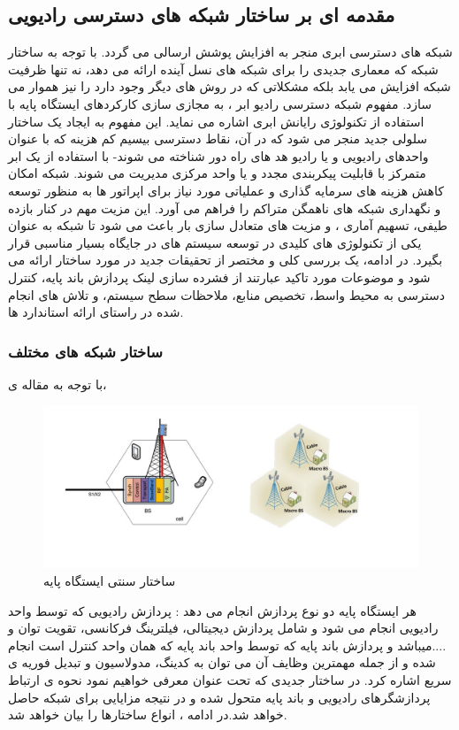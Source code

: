 \subsection{مقدمه ای بر ساختار شبکه های دسترسی رادیویی }
شبکه های دسترسی ابری منجر به افزایش پوشش ارسالی می گردد. با توجه به ساختار شبکه
    که معماری جدیدی را برای شبکه های نسل آینده
ارائه می دهد، نه تنها ظرفیت شبکه افزایش می یابد بلکه
مشکلاتی که در روش های دیگر وجود دارد را نیز هموار
می سازد.
مفهوم شبکه دسترسی رادیو ابر ، به مجازی سازی کارکردهای ایستگاه  پایه  با استفاده از تکنولوژی رایانش ابری  اشاره می نماید. این مفهوم به ایجاد یک ساختار سلولی جدید منجر می شود که در آن، نقاط دسترسی بیسیم کم هزینه که با عنوان واحدهای رادیویی  و یا رادیو هد های
  راه دور 
 شناخته می شوند- با استفاده از یک ابر متمرکز با قابلیت پیکربندی مجدد و یا واحد مرکزی  مدیریت می شوند. شبکه امکان کاهش هزینه های سرمایه گذاری و عملیاتی مورد نیاز برای اپراتور ها به منظور توسعه و نگهداری شبکه های ناهمگن متراکم را فراهم می آورد. این مزیت مهم در کنار بازده طیفی، تسهیم آماری ، و مزیت های متعادل سازی بار باعث می شود تا شبکه  به عنوان یکی از تکنولوژی های کلیدی در توسعه سیستم های  در جایگاه بسیار مناسبی قرار بگیرد. در ادامه، یک بررسی کلی و مختصر از تحقیقات جدید در مورد ساختار  ارائه می شود و موضوعات مورد تاکید عبارتند از فشرده سازی لینک  پردازش باند پایه، کنترل دسترسی به محیط واسط، تخصیص منابع، ملاحظات سطح سیستم، و تلاش های انجام شده در راستای ارائه استاندارد ها.
\subsubsection{ساختار شبکه های مختلف }
با توجه به مقاله ی\cite{checko2015cloud}،
\begin{figure}
  \centering
    \includegraphics[scale=0.7]{./fig/c11}
  \caption{ساختار سنتی ایستگاه پایه \cite{checko2015cloud}}
  \label{fig:c11}
\end{figure}
هر ایستگاه پایه دو نوع پردازش انجام می دهد : پردازش
رادیویی که توسط واحد رادیویی  انجام می شود و شامل پردازش
دیجیتالی، فیلترینگ فرکانسی، تقویت توان و ....میباشد و
پردازش باند پایه که توسط واحد باند پایه  که همان واحد کنترل است  انجام شده و از جمله
مهمترین وظایف آن می توان به کدینگ، مدولاسیون و
تبدیل فوریه ی سریع اشاره کرد. در ساختار جدیدی که
تحت عنوان   معرفی خواهیم نمود نحوه ی ارتباط
پردازشگرهای رادیویی و باند پایه متحول شده و در نتیجه
مزایایی برای شبکه حاصل خواهد شد.در ادامه ، انواع ساختارها را بیان خواهد شد.
